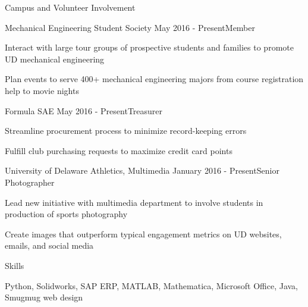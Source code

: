 \documentclass{resume} %
\begin{document}
\begin{rSection}{Campus and Volunteer Involvement} \itemsep -2pt   

\begin{rSubsection}{Mechanical Engineering Student Society} {May 2016 - Present}{Member}{}

\item Interact with large tour groups of prospective students and families to promote UD mechanical engineering
\item Plan events to serve 400+ mechanical engineering majors from course registration help to movie nights
 
\end{rSubsection}  

\begin{rSubsection}{Formula SAE} {May 2016 - Present}{Treasurer}{}

\item Streamline procurement process to minimize record-keeping errors 
\item Fulfill club purchasing requests to maximize credit card points
 
\end{rSubsection}  

\begin{rSubsection}{University of Delaware Athletics, Multimedia} {January 2016 - Present}{Senior Photographer}{}

\item Lead new initiative with multimedia department to involve students in production of sports photography
\item Create images that outperform typical engagement metrics on UD websites, emails, and social media
 
\end{rSubsection}  

\end{rSection} 


\begin{rSection}{Skills}

\begin{rSubsection}{}{}{}{}
\item Python, Solidworks, SAP ERP, MATLAB, Mathematica, Microsoft Office, Java, Smugmug web design
\end{rSubsection}

\end{rSection}
\end{document}
